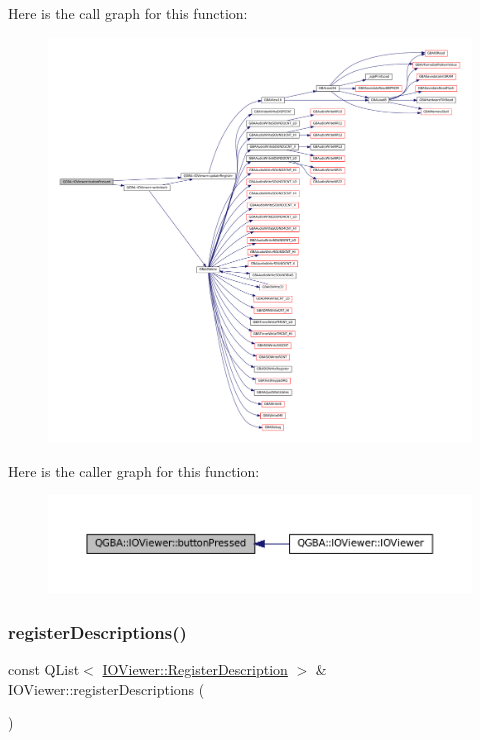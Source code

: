 Here is the call graph for this function\+:
\nopagebreak
\begin{figure}[H]
\begin{center}
\leavevmode
\includegraphics[width=350pt]{class_q_g_b_a_1_1_i_o_viewer_a2ec5269b69bdbdf23c195fdb76a91be9_cgraph}
\end{center}
\end{figure}
Here is the caller graph for this function\+:
\nopagebreak
\begin{figure}[H]
\begin{center}
\leavevmode
\includegraphics[width=350pt]{class_q_g_b_a_1_1_i_o_viewer_a2ec5269b69bdbdf23c195fdb76a91be9_icgraph}
\end{center}
\end{figure}
\mbox{\label{class_q_g_b_a_1_1_i_o_viewer_aa3556b84da7a172cacd46b3582d1bfa5}} 
\subsubsection{\texorpdfstring{register\+Descriptions()}{registerDescriptions()}}
{\footnotesize\ttfamily const Q\+List$<$ \mbox{\hyperlink{class_q_g_b_a_1_1_i_o_viewer_ac2099e64016757f9d1162bab33cf51bf}{I\+O\+Viewer\+::\+Register\+Description}} $>$ \& I\+O\+Viewer\+::register\+Descriptions (\begin{DoxyParamCaption}{ }\end{DoxyParamCaption})\hspace{0.3cm}{\ttfamily [static]}}

